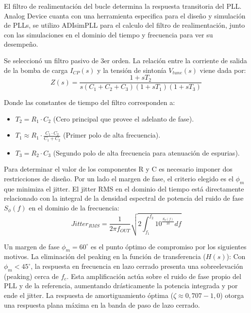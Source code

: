 \documentclass[11pt,a4paper,twoside]{report}
\begin{document}
	El filtro de realimentación del bucle determina la respuesta transitoria del PLL. Analog Device cuanta con una herramienta especifica para el diseño y simulación de PLLs, se utilizo ADIsimPLL para el calculo del filtro de realimentación, junto con las simulaciones en el dominio del tiempo y frecuencia para ver su desempeño. 
	
	Se seleccionó un filtro pasivo de 3er orden. La relación entre la corriente de salida de la bomba de carga $I_{CP}(s)$ y la tensión de sintonía $V_{tune}(s)$ viene dada por:
	\begin{equation}
		Z(s) = \frac{1 + s T_2}{s (C_1 + C_2 + C_3) (1 + s T_1) (1 + s T_3)}
	\end{equation}\newpage
	
	Donde las constantes de tiempo del filtro corresponden a:
	\begin{itemize}
		\item $T_2 = R_1 \cdot C_2$ (Cero principal que provee el adelanto de fase).
		\item $T_1 \approx R_1 \cdot \frac{C_1 \cdot C_2}{C_1 + C_2}$ (Primer polo de alta frecuencia).
		\item $T_3 = R_2 \cdot C_3$ (Segundo polo de alta frecuencia para atenuación de espurias).
	\end{itemize}
	
	Para determinar el valor de los componentes R y C es necesario imponer dos restricciones de diseño. Por un lado el margen de fase, el criterio elegido es el $\phi_m$ que minimiza el jitter. El jitter RMS en el dominio del tiempo está directamente relacionado con la integral de la densidad espectral de potencia del ruido de fase $S_\phi(f)$ en el dominio de la frecuencia:
	\begin{equation}
		Jitter_{RMS} = \frac{1}{2\pi f_{OUT}} \sqrt{2 \int_{f_1}^{f_2} 10^{\frac{S_\phi(f)}{10}} df}
	\end{equation} 
	
	Un margen de fase $\phi_m = 60^\circ$ es el punto óptimo de compromiso por los siguientes motivos. La eliminación del peaking en la función de transferencia ($H(s)$): Con $\phi_m < 45^\circ$, la respuesta en frecuencia en lazo cerrado presenta una sobreelevación (peaking) cerca de $f_c$. Esta amplificación actúa sobre el ruido de fase propio del PLL y de la referencia, aumentando drásticamente la potencia integrada y por ende el jitter. La respuesta de amortiguamiento óptima ($\zeta \approx 0{,}707 - 1{,}0$) otorga una respuesta plana máxima en la banda de paso de lazo cerrado.
	
\end{document}
